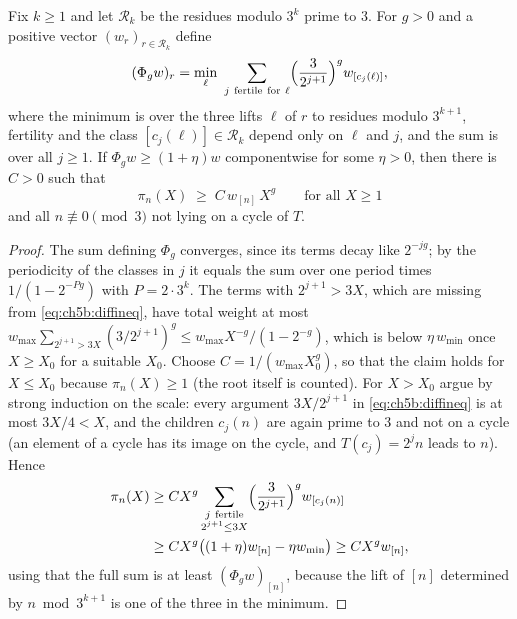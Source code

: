 \begin{theorem}\label{thm:ch5b:exponent}
Fix $k\ge1$ and let $\mathcal R_k$ be the residues modulo $3^k$ prime to $3$.
For $g>0$ and a positive vector $(w_r)_{r\in\mathcal R_k}$ define
\[
  (\Phi_g w)_r=\min_{\ell}\ \sum_{j\ \mathrm{fertile\ for}\ \ell}
  \Bigl(\frac3{2^{j+1}}\Bigr)^g w_{[c_j(\ell)]},
\]
where the minimum is over the three lifts $\ell$ of $r$ to residues modulo
$3^{k+1}$, fertility and the class $[c_j(\ell)]\in\mathcal R_k$ depend only on
$\ell$ and $j$, and the sum is over all $j\ge1$. If $\Phi_g w\ge(1+\eta)w$
componentwise for some $\eta>0$, then there is $C>0$ such that
\[
  \pi_n(X)\;\ge\;C\,w_{[n]}\,X^g\qquad\text{for all }X\ge1
\]
and all $n\not\equiv0\pmod3$ not lying on a cycle of $T$.
\end{theorem}

\begin{proof}
The sum defining $\Phi_g$ converges, since its terms decay like $2^{-jg}$; by
the periodicity of the classes in $j$ it equals the sum over one period times
$1/(1-2^{-Pg})$ with $P=2\cdot3^k$. The terms with $2^{j+1}>3X$, which are
missing from \eqref{eq:ch5b:diffineq}, have total weight at most
$w_{\max}\sum_{2^{j+1}>3X}(3/2^{j+1})^g\le w_{\max}X^{-g}/(1-2^{-g})$,
which is below $\eta\,w_{\min}$ once $X\ge X_0$ for a suitable $X_0$. Choose
$C=1/(w_{\max}X_0^g)$, so that the claim holds for $X\le X_0$ because
$\pi_n(X)\ge1$ (the root itself is counted). For $X>X_0$ argue by strong induction
on the scale: every argument $3X/2^{j+1}$ in \eqref{eq:ch5b:diffineq} is at most
$3X/4<X$, and the children $c_j(n)$ are again prime to $3$ and not on a cycle
(an element of a cycle has its image on the cycle, and $T(c_j)=2^jn$ leads to
$n$). Hence
\begin{align*}
  \pi_n(X)&\ge C X^g\sum_{\substack{j\ \mathrm{fertile}\\2^{j+1}\le3X}}
  \Bigl(\frac3{2^{j+1}}\Bigr)^g w_{[c_j(n)]}\\
  &\ge CX^g\bigl((1+\eta)w_{[n]}-\eta w_{\min}\bigr)\ge CX^g w_{[n]},
\end{align*}
using that the full sum is at least $(\Phi_g w)_{[n]}$, because the lift of
$[n]$ determined by $n\bmod3^{k+1}$ is one of the three in the minimum.
\end{proof}

